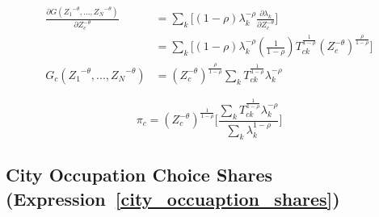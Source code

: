 \documentclass[10pt]{article}
\begin{document}
\begin{align*}
    \frac{\partial{G({Z_{1}}^{-\theta},...,{Z_{N}}^{-\theta})}}{\partial{Z_{c}^{-\theta}}} & = \sum\limits_{k}\Big[(1-\rho)\lambda^{-\rho}_{k}\frac{\partial{\lambda_{k}}}{\partial{Z_{c}^{-\theta}}}\Big]                              \\
                                                                                           & = \sum\limits_{k}\Big[(1-\rho)\lambda^{-\rho}_{k}(\frac{1}{1-\rho}){T^{\frac{1}{1-\rho}}_{ck}}(Z_{c}^{-\theta})^{\frac{\rho}{1-\rho}}\Big] \\
    G_c ({Z_{1}}^{-\theta},...,{Z_{N}}^{-\theta})                                          & = (Z_{c}^{-\theta})^{\frac{\rho}{1-\rho}}\sum\limits_{k}{T^{\frac{1}{1-\rho}}_{ck}}\lambda_{k}^{-\rho}
\end{align*}

\begin{equation*}
    \pi_{c} = (Z_{c}^{-\theta})^{\frac{1}{1-\rho}}\Bigg[\frac{\sum\limits_{k}{T^{\frac{1}{1-\rho}}_{ck}}\lambda_{k}^{-\rho}}{\sum\limits_{k}\lambda_{k}^{1-\rho}}\Bigg]
\end{equation*}

\subsection{City Occupation Choice Shares (Expression~\ref{city_occuaption_shares})}
\end{document}
